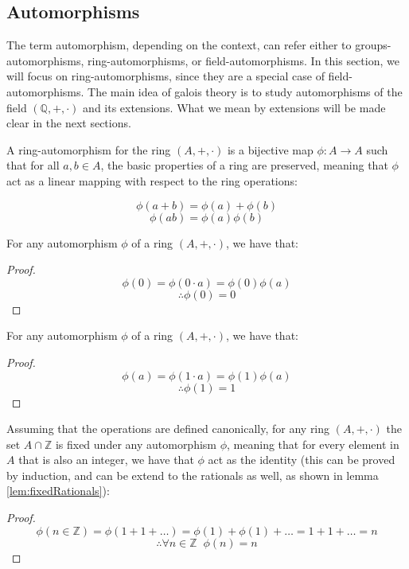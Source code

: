 \subsection{Automorphisms}
The term automorphism, depending on the context, can refer either to groups-automorphisms, 
ring-automorphisms, or field-automorphisms. In this section, we will focus on ring-automorphisms, since they 
are a special case of field-automorphisms. The main idea of galois theory is to study automorphisms of 
the field $(\mathbb{Q}, +, \cdot)$ and its extensions. What we mean by extensions will be made clear in the
next sections. \\

\begin{definition}
A ring-automorphism for the ring $(A, +, \cdot)$ is a bijective map $\phi: A \to A$ such that for all $a, b \in A$, 
the basic properties of a ring are preserved, meaning that $\phi$ act as a linear mapping with respect to the ring operations:

$$ \phi(a + b) = \phi(a) + \phi(b) $$
$$ \phi(ab) = \phi(a)\phi(b) $$ \vspace{0.2em}
\end{definition}

\begin{lemma}
For any automorphism $\phi$ of a ring $(A, +, \cdot)$, we have that:
\end{lemma}
\begin{proof}
$$ \phi(0) = \phi(0 \cdot a) = \phi(0) \phi(a) $$
$$ \therefore \phi(0) = 0 $$
\end{proof}


\begin{lemma}
For any automorphism $\phi$ of a ring $(A, +, \cdot)$, we have that:
\end{lemma}
\begin{proof}
$$ \phi(a) = \phi(1 \cdot a) = \phi(1) \phi(a) $$
$$ \therefore \phi(1) = 1 $$
\end{proof}


\begin{lemma}
Assuming that the operations are defined canonically, for any ring $(A, +, \cdot)$ the 
set $A \cap \mathbb{Z}$ is fixed under any automorphism $\phi$, meaning that 
for every element in $A$ that is also an integer, we have that $\phi$ act as the identity (this can 
be proved by induction, and can be extend to the rationals as well, as shown in lemma \ref{lem:fixedRationals}):
\end{lemma}
\begin{proof}
$$ \phi(n \in \mathbb{Z}) = \phi(1 + 1 + \dots) = \phi(1) + \phi(1) + \dots = 1 + 1 + \dots = n $$
$$ \therefore \forall n \in \mathbb{Z}\;\; \phi(n) = n $$
\end{proof}

